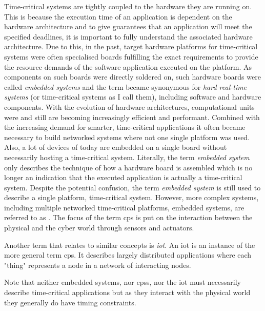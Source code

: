 Time-critical systems are tightly coupled to the hardware they are running on.
This is because the execution time of an application is dependent on the hardware architecture and to give guarantees that an application will meet the specified deadlines, it is important to fully understand the associated hardware architecture.
Due to this, in the past, target hardware platforms for time-critical systems were often specialised boards fulfilling the exact requirements to provide the resource demands of the software application executed on the platform.
As components on such boards were directly soldered on, such hardware boards were called \emph{embedded systems} and the term became synonymous for \emph{hard real-time systems} (or time-critical systems as I call them), including software and hardware components.
With the evolution of hardware architectures, computational units were and still are becoming increasingly efficient and performant.
Combined with the increasing demand for smarter, time-critical applications it often became necessary to build networked systems where not one single platform was used.
Also, a lot of devices of today are embedded on a single board without necessarily hosting a time-critical system.
Literally, the term \emph{embedded system} only describes the technique of how a hardware board is assembled which is no longer an indication that the executed application is actually a time-critical system.
Despite the potential confusion, the term \emph{embedded system} is still used to describe a single platform, time-critical system.
However, more complex systems, including multiple networked time-critical platforms, \ie embedded systems, are referred to as \emph{}.
The focus of the term \gls{cps} is put on the interaction between the physical and the cyber world through sensors and actuators.

Another term that relates to similar concepts is \emph{\acrfull{iot}}.
An \gls{iot} is an instance of the more general term \gls{cps}.
It describes largely distributed applications where each "thing" represents a node in a network of interacting nodes.

Note that neither embedded systems, nor \glspl{cps}, nor the \gls{iot} must necessarily describe time-critical applications but as they interact with the physical world they generally do have timing constraints.

